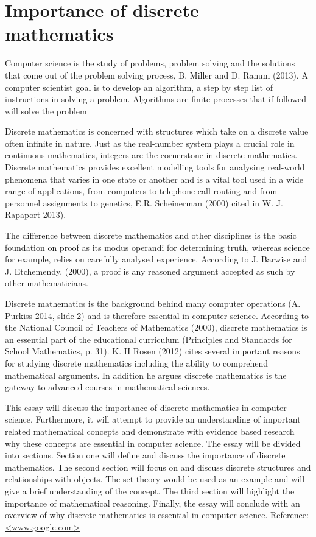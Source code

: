 \documentclass{article}
\begin{document}
\section{Importance of discrete mathematics}
Computer science is the study of problems, problem solving and the solutions that come out of the problem solving process, B. Miller and D. Ranum (2013). A computer scientist goal is to develop an algorithm, a step by step list of instructions in solving a problem. Algorithms are finite processes that if followed will solve the problem

Discrete mathematics is concerned with structures which take on a discrete value often infinite in nature. Just as the real-number system plays a crucial role in continuous mathematics, integers are the cornerstone in discrete mathematics. Discrete mathematics provides excellent modelling tools for analysing real-world phenomena that varies in one state or another and is a vital tool used in a wide range of applications, from computers to telephone call routing and from personnel assignments to genetics, E.R. Scheinerman (2000) cited in W. J. Rapaport 2013).

The difference between discrete mathematics and other disciplines is the basic foundation on proof as its modus operandi for determining truth, whereas science for example, relies on carefully analysed experience. According to J. Barwise and J. Etchemendy, (2000), a proof is any reasoned argument accepted as such by other mathematicians.

Discrete mathematics is the background behind many computer operations (A. Purkiss 2014, slide 2) and is therefore essential in computer science. According to the National Council of Teachers of Mathematics (2000), discrete mathematics is an essential part of the educational curriculum (Principles and Standards for School Mathematics, p. 31). K. H Rosen (2012) cites several important reasons for studying discrete mathematics including the ability to comprehend mathematical arguments. In addition he argues discrete mathematics is the gateway to advanced courses in mathematical sciences.

This essay will discuss the importance of discrete mathematics in computer science. Furthermore, it will attempt to provide an understanding of important related mathematical concepts and demonstrate with evidence based research why these concepts are essential in computer science. The essay will be divided into sections. Section one will define and discuss the importance of discrete mathematics. The second section will focus on and discuss discrete structures and relationships with objects. The set theory would be used as an example and will give a brief understanding of the concept. The third section will highlight the importance of mathematical reasoning. Finally, the essay will conclude with an overview of why discrete mathematics is essential in computer science.
Reference:\\
\url{<www.google.com>}
\end{document}
